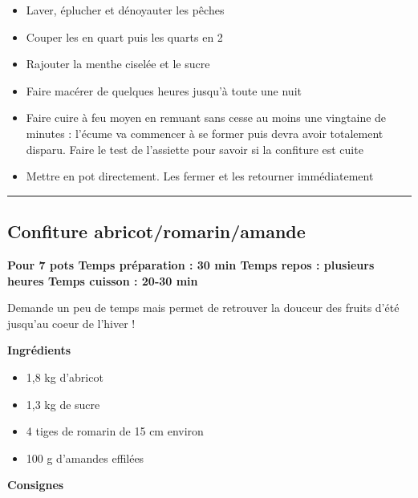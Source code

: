 \documentclass[]{book}
\providecommand{\tightlist}{%
  \setlength{\itemsep}{0pt}\setlength{\parskip}{0pt}}
\begin{document}
\begin{itemize}
\tightlist
\item
  Laver, éplucher et dénoyauter les pêches
\item
  Couper les en quart puis les quarts en 2
\item
  Rajouter la menthe ciselée et le sucre
\item
  Faire macérer de quelques heures jusqu'à toute une nuit
\item
  Faire cuire à feu moyen en remuant sans cesse au moins une vingtaine de minutes : l'écume va commencer à se former puis devra avoir totalement disparu. Faire le test de l'assiette pour savoir si la confiture est cuite
\item
  Mettre en pot directement. Les fermer et les retourner immédiatement
\end{itemize}

\begin{center}\rule{0.5\linewidth}{0.5pt}\end{center}

\hypertarget{confiture-abricotromarinamande}{%
\subsection*{\texorpdfstring{{Confiture abricot/romarin/amande}}{Confiture abricot/romarin/amande}}\label{confiture-abricotromarinamande}}

\begin{sucrebox}
\textbf{Pour 7 pots \textbar{} Temps préparation : 30 min \textbar{}
Temps repos : plusieurs heures\textbar{} Temps cuisson : 20-30 min}

Demande un peu de temps mais permet de retrouver la douceur des fruits
d'été jusqu'au coeur de l'hiver !
\end{sucrebox}

\textbf{Ingrédients}

\begin{itemize}
\tightlist
\item
  1,8 kg d'abricot
\item
  1,3 kg de sucre
\item
  4 tiges de romarin de 15 cm environ
\item
  100 g d'amandes effilées
\end{itemize}

\textbf{Consignes}
\end{document}
